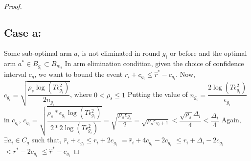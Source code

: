 \begin{proof}
\subsection{Case a:} 
Some sub-optimal arm $a_{i}$ is not eliminated in round $g_{i}$ or before and the optimal arm $a^{*}\in B_{g_{i}} \subset B_{m_{i}}$
\newline In arm elimination condition, given the choice of confidence interval $c_{g}$, we want to bound the event $\hat{r}_{i}+c_{g_{i}}\leq \hat{r}^{*}-c_{g_{i}}$.
\newline Now, $c_{g_{i}}=\sqrt{\dfrac{\rho_{s} \log (T\epsilon_{g_{i}}^{2})}{2 n_{g_{i}}}}$, where $0 < \rho_{s}\leq 1$
\newline Putting the value of $n_{g_{i}}=\dfrac{2\log{(T\epsilon_{g_{i}}^{2})}}{\epsilon_{g_{i}}}$ in $c_{g_{i}}$,
\newline $c_{g_{i}}=\sqrt{\dfrac{\rho_{s}*\epsilon_{g_{i}}\log (T\epsilon_{g_{i}}^{2})}{2*2 \log(T\epsilon_{g_{i}}^{2})}}=\sqrt{\dfrac{\rho_{s}\epsilon_{g_{i}}}{2}} = \sqrt{\rho_{s}\epsilon_{g_{i}+1}} < \dfrac{\sqrt{\rho_{s}}\Delta_{i}}{4} < \dfrac{\Delta_{i}}{4} $
\newline Again, $\exists a_{i} \in C_{g}$ such that, 
$\hat{r}_{i} + c_{g_{i}}\leq r_{i} + 2c_{g_{i}} $
\newline\hspace*{14em}$= \hat{r}_{i} + 4c_{g_{i}} - 2c_{g_{i}} $
\newline\hspace*{14em}$\leq r_{i} + \Delta_{i} - 2c_{g_{i}}$
\newline\hspace*{14em}$< r^{*} -2c_{g_{i}} $
\newline\hspace*{14em}$\leq \hat{r}^{*} - c_{g_{i}}$

\end{proof}
